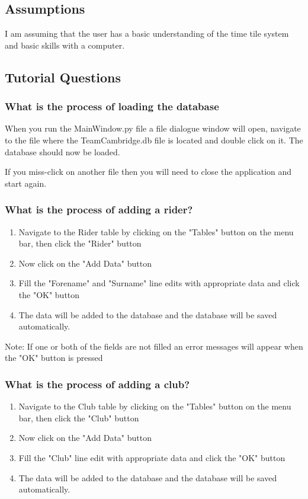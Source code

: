 \subsection{Assumptions}
I am assuming that the user has a basic understanding of the time tile system and basic skills with a computer.
\subsection{Tutorial Questions}

\subsubsection{What is the process of loading the database}
When you run the MainWindow.py file a file dialogue window will open, navigate to the file where the TeamCambridge.db file is located and double click on it. The database should now be loaded.

If you miss-click on another file then you will need to close the application and start again.

\subsubsection{What is the process of adding a rider?}
\begin{enumerate}
\item Navigate to the Rider table by clicking on the "Tables" button on the menu bar, then click the "Rider" button
\item Now click on the "Add Data" button
\item Fill the "Forename" and "Surname" line edits with appropriate data and click the "OK" button
\item The data will be added to the database and the database will be saved automatically.
\end{enumerate}

Note: If one or both of the fields are not filled an error messages will appear when the "OK" button is pressed

\subsubsection{What is the process of adding a club?}
\begin{enumerate}
\item Navigate to the Club table by clicking on the "Tables" button on the menu bar, then click the "Club" button
\item Now click on the "Add Data" button
\item Fill the "Club" line edit with appropriate data and click the "OK" button
\item The data will be added to the database and the database will be saved automatically.
\end{enumerate}

